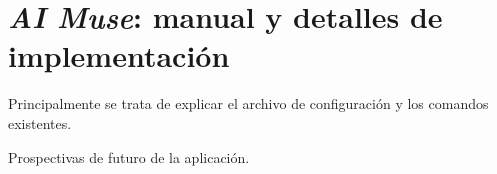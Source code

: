 \chapter{\emph{AI Muse}: manual y detalles de implementación}
\label{anexo:aimuse}


Principalmente se trata de explicar el archivo de configuración y los comandos existentes.

Prospectivas de futuro de la aplicación.
